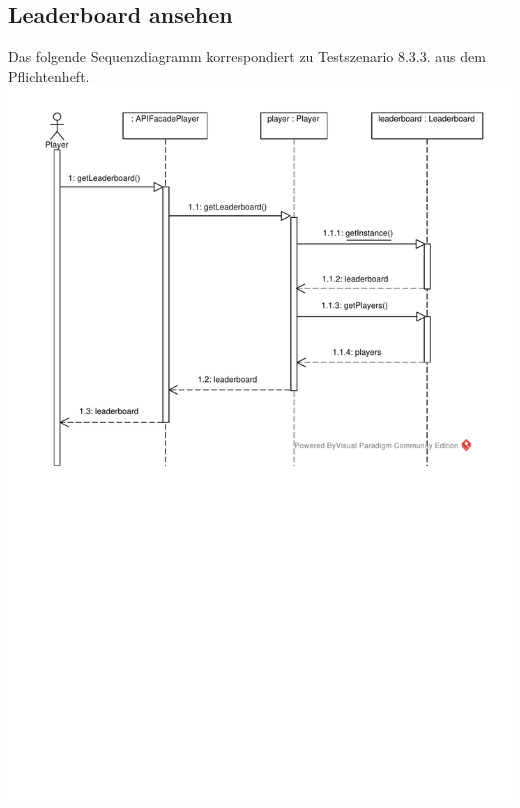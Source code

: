 \documentclass[a4paper]{scrreprt}
\begin{document}
	\subsection{Leaderboard ansehen}
	Das folgende Sequenzdiagramm korrespondiert zu Testszenario 8.3.3. aus dem Pflichtenheft. \\
	\includegraphics[width=\textwidth]{img/Leaderboard_ansehen .pdf}
\end{document}
